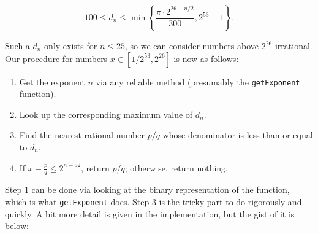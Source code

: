 \documentclass{article}
\begin{document}
$$\boxed{100 \leq d_n \leq \min \left\{ \frac{\pi\cdot 2^{26 - n/2}}{300}, 2^{53} - 1\right\}}.$$

Such a $d_n$ only exists for $n \leq 25$, so we can consider numbers above $2^{26}$ irrational. Our procedure for numbers $x\in [1/2^{53}, 2^{26}]$ is now as follows:

\begin{enumerate}
\item Get the exponent $n$ via any reliable method (presumably the \texttt{getExponent} function).
\item Look up the corresponding maximum value of $d_n$.
\item Find the nearest rational number $p/q$ whose denominator is less than or equal to $d_n$.
\item If $x-\frac{p}{q}\leq 2^{n-52}$, return $p/q$; otherwise, return nothing.
\end{enumerate}

Step 1 can be done via looking at the binary representation of the function, which is what \texttt{getExponent} does. Step 3 is the tricky part to do rigorously and quickly. A bit more detail is given in the implementation, but the gist of it is below:
\end{document}

